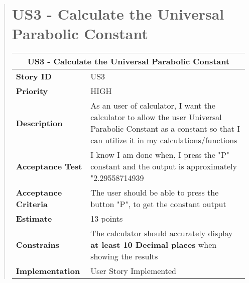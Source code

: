 \documentclass[12pt]{report}
\begin{document}
\begin{quote}
              \section{US3 - Calculate the Universal Parabolic Constant}
                \begin{tabular}{ |p{4cm}|p{10cm}| }
                 \hline
                 \multicolumn{2}{|c|}{\textbf{US3 - Calculate the Universal Parabolic Constant} } \\
                 \hline
                 \textbf {Story ID}& US3  \\
                 \hline
                 \textbf{Priority} & HIGH \\
                 \hline
                 \textbf{Description}   & As an user of calculator, I want the calculator to allow the user Universal Parabolic Constant as a constant so that I can utilize it in my calculations/functions \\
                 \hline
                 \textbf{Acceptance Test}& I know I am done when, I press the "P" constant and the output is approximately "2.29558714939 \\
                 \hline
                 \textbf{Acceptance Criteria}& The user should be able to press the button "P", to get the constant output \\
                 \hline
                 \textbf{Estimate} &  13 points  \\
                 \hline
                 \textbf{Constrains}& The calculator should accurately display  \textbf{at least 10 Decimal places} when showing the results  \\
                \hline
                         \textbf {Implementation}&User Story Implemented \\
                \hline
                \end{tabular}
            

\end{quote}
\end{document}

